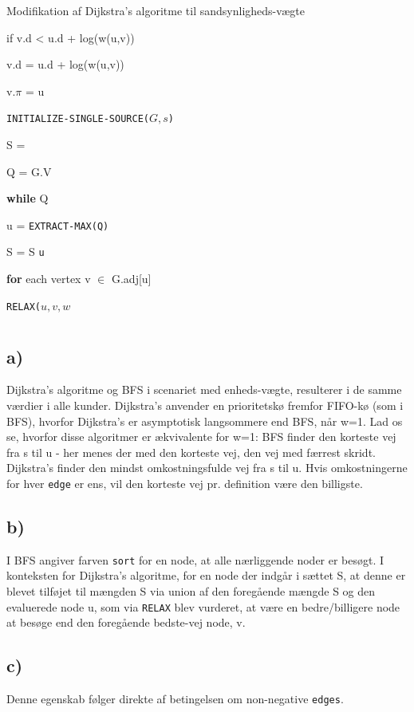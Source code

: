 \documentclass[a4paper,10pt]{article}
\begin{document}
\begin{algorithm}[H]
\caption{Modifikation af Dijkstra's algoritme til sandsynligheds-vægte}
\begin{algorithmic}[1]
\State \parbox[t]{.7\linewidth}{if v.d < u.d + log(w(u,v))}
\Indent
\State \parbox[t]{.7\linewidth}{v.d = u.d + log(w(u,v))}
\State \parbox[t]{.7\linewidth}{v.$\pi$ = u}
\EndIndent
\end{algorithmic}
\begin{algorithmic}[1]
\State \parbox[t]{.7\linewidth}{\texttt{INITIALIZE-SINGLE-SOURCE($G,s$)}}
\State \parbox[t]{.7\linewidth}{S = \varemptyset}
\State \parbox[t]{.7\linewidth}{Q = G.V}
\State \parbox[t]{.7\linewidth}{\textbf{while} Q \neq \varemptyset}
\Indent
\State \parbox[t]{.7\linewidth}{u = \texttt{EXTRACT-MAX(Q)}}
\State \parbox[t]{.7\linewidth}{S = S \cup \texttt{{u}}}
\State \parbox[t]{.7\linewidth}{\textbf{for} each vertex v $\in$ G.adj[u]}
\Indent
\State \parbox[t]{.7\linewidth}{\texttt{RELAX($u,v,w$}}
\EndIndent
\EndIndent
\end{algorithmic}
\end{algorithm}

\section{}
\subsection{a)}
Dijkstra's algoritme og BFS i scenariet med enheds-vægte, resulterer i de samme værdier i alle kunder. Dijkstra's anvender en prioritetskø fremfor FIFO-kø (som i BFS), hvorfor Dijkstra's er asymptotisk langsommere end BFS, når w=1. Lad os se, hvorfor disse algoritmer er ækvivalente for w=1:
BFS finder den korteste vej fra s til u - her menes der med den korteste vej, den vej med færrest skridt. Dijkstra's finder den mindst omkostningsfulde vej fra s til u. Hvis omkostningerne for hver \texttt{edge} er ens, vil den korteste vej pr. definition være den billigste. 
\subsection{b)}
I BFS angiver farven \texttt{sort} for en node, at alle nærliggende noder er besøgt. I konteksten for Dijkstra's algoritme, for en node der indgår i sættet S, at denne er blevet tilføjet til mængden S via union af den foregående mængde S og den evaluerede node u, som via \texttt{RELAX} blev vurderet, at være en bedre/billigere node at besøge end den foregående bedste-vej node, v. 
\subsection{c)}
Denne egenskab følger direkte af betingelsen om non-negative \texttt{edges}. 
\end{document}
